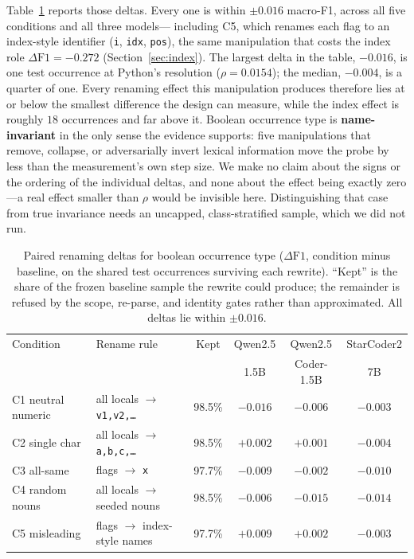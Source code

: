 Table~\ref{tab:boolean-renaming} reports those deltas. Every one is within
$\pm 0.016$ macro-F1, across all five conditions and all three models---
including C5, which renames each flag to an index-style identifier
(\texttt{i}, \texttt{idx}, \texttt{pos}), the same manipulation that costs
the index role $\Delta\mathrm{F1} = -0.272$ (Section~\ref{sec:index}). The
largest delta in the table, $-0.016$, is one test occurrence at Python's
resolution ($\rho = 0.0154$); the median, $-0.004$, is a quarter of one.
Every renaming effect this manipulation produces therefore lies at or
below the smallest difference the design can measure, while the index
effect is roughly $18$ occurrences and far above it. Boolean occurrence
type is \textbf{name-invariant} in the only sense the evidence supports:
five manipulations that remove, collapse, or adversarially invert lexical
information move the probe by less than the measurement's own step size.
We make no claim about the signs or the ordering of the individual deltas,
and none about the effect being exactly zero---a real effect smaller than
$\rho$ would be invisible here. Distinguishing that case from true
invariance needs an uncapped, class-stratified sample, which we did not
run.

\begin{table}[t]
\centering
\caption{Paired renaming deltas for boolean occurrence type
($\Delta\mathrm{F1}$, condition minus baseline, on the shared test
occurrences surviving each rewrite). ``Kept'' is the share of the frozen
baseline sample the rewrite could produce; the remainder is refused by the
scope, re-parse, and identity gates rather than approximated. All deltas
lie within $\pm 0.016$.}
\label{tab:boolean-renaming}
\begin{tabular}{llcccc}
\toprule
Condition & Rename rule & Kept & Qwen2.5 & Qwen2.5 & StarCoder2 \\
 & & & 1.5B & Coder-1.5B & 7B \\
\midrule
C1 neutral numeric & all locals $\to$ \texttt{v1,v2,\dots} & 98.5\% & $-0.016$ & $-0.006$ & $-0.003$ \\
C2 single char     & all locals $\to$ \texttt{a,b,c,\dots} & 98.5\% & $+0.002$ & $+0.001$ & $-0.004$ \\
C3 all-same        & flags $\to$ \texttt{x}                & 97.7\% & $-0.009$ & $-0.002$ & $-0.010$ \\
C4 random nouns    & all locals $\to$ seeded nouns         & 98.5\% & $-0.006$ & $-0.015$ & $-0.014$ \\
C5 misleading      & flags $\to$ index-style names         & 97.7\% & $+0.009$ & $+0.002$ & $-0.003$ \\
\bottomrule
\end{tabular}
\end{table}

